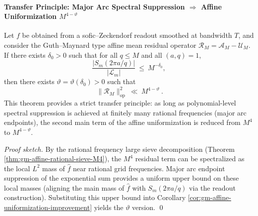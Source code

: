 \paragraph{Transfer Principle: Major Arc Spectral Suppression \texorpdfstring{$\Rightarrow$}{=>} Affine Uniformization \texorpdfstring{$M^{4-\vartheta}$}{M4-vtheta}}
\begin{theorem}[Modular Major Arc Spectral Suppression \texorpdfstring{$\Rightarrow$}{=>} Affine Uniformization Power Saving: From Pisano Spectrum to \texorpdfstring{$M^{4-\vartheta}$}{M4-vtheta}]\label{thm:gm-mod-gap-to-affine-saving}
Let \(f\) be obtained from a sofic--Zeckendorf readout smoothed at bandwidth \(T\), and consider the Guth--Maynard type affine mean residual operator \(\mathcal{R}_M=\mathcal{A}_M-\mathcal{U}_M\).
If there exists \(\delta_0>0\) such that for all \(q\le M\) and all \((a,q)=1\),
\[
\frac{|S_m(2\pi a/q)|}{|\mathcal{L}_m|}\ \le\ M^{-\delta_0},
\]
then there exists \(\vartheta=\vartheta(\delta_0)>0\) such that
\[
\boxed{\ \|\mathcal{R}_M\|_{\mathrm{op}}^2\ \ll\ M^{4-\vartheta}\ }.
\]
This theorem provides a strict transfer principle: as long as polynomial-level spectral suppression is achieved at finitely many rational frequencies (major arc endpoints), the second main term of the affine uniformization is reduced from \(M^4\) to \(M^{4-\vartheta}\).
\end{theorem}

\begin{proof}[Proof sketch]
By the rational frequency large sieve decomposition (Theorem \ref{thm:gm-affine-rational-sieve-M4}), the \(M^4\) residual term can be spectralized as the local \(L^2\) mass of \(\widehat f\) near rational grid frequencies.
Major arc endpoint suppression of the exponential sum provides a uniform upper bound on these local masses (aligning the main mass of \(\widehat f\) with \(S_m(2\pi a/q)\) via the readout construction).
Substituting this upper bound into Corollary \ref{cor:gm-affine-uniformization-improvement} yields the \(\vartheta\) version. \qed
\end{proof}

